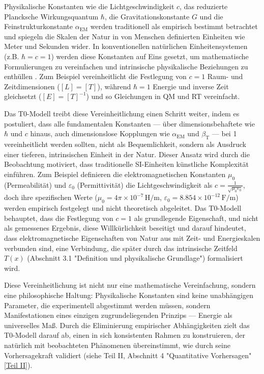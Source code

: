 \documentclass[12pt,a4paper]{article}
\newcommand{\Tfield}{T(x)}
\newcommand{\alphaEM}{\alpha_{\text{EM}}}
\newcommand{\betaT}{\beta_{\text{T}}}
\begin{document}
	Physikalische Konstanten wie die Lichtgeschwindigkeit \(c\), das reduzierte Plancksche Wirkungsquantum \(\hbar\), die Gravitationskonstante \(G\) und die Feinstrukturkonstante \(\alphaEM\) werden traditionell als empirisch bestimmt betrachtet und spiegeln die Skalen der Natur in von Menschen definierten Einheiten wie Meter und Sekunden wider. In konventionellen natürlichen Einheitensystemen (z.B. \(\hbar = c = 1\)) werden diese Konstanten auf Eins gesetzt, um mathematische Formulierungen zu vereinfachen und intrinsische physikalische Beziehungen zu enthüllen \cite{Planck1899,Duff2002}. Zum Beispiel vereinheitlicht die Festlegung von \(c = 1\) Raum- und Zeitdimensionen (\([L] = [T]\)), während \(\hbar = 1\) Energie und inverse Zeit gleichsetzt (\([E] = [T]^{-1}\)) und so Gleichungen in QM und RT vereinfacht.
	
	Das T0-Modell treibt diese Vereinheitlichung einen Schritt weiter, indem es postuliert, dass alle fundamentalen Konstanten — über dimensionsbehaftete wie \(\hbar\) und \(c\) hinaus, auch dimensionslose Kopplungen wie \(\alphaEM\) und \(\betaT\) — bei 1 vereinheitlicht werden sollten, nicht als Bequemlichkeit, sondern als Ausdruck einer tieferen, intrinsischen Einheit in der Natur. Dieser Ansatz wird durch die Beobachtung motiviert, dass traditionelle SI-Einheiten künstliche Komplexität einführen. Zum Beispiel definieren die elektromagnetischen Konstanten \(\mu_0\) (Permeabilität) und \(\varepsilon_0\) (Permittivität) die Lichtgeschwindigkeit als \(c = \frac{1}{\sqrt{\mu_0\varepsilon_0}}\), doch ihre spezifischen Werte (\(\mu_0 = 4\pi \times 10^{-7} \, \text{H/m}\), \(\varepsilon_0 = 8.854 \times 10^{-12} \, \text{F/m}\)) werden empirisch festgelegt und nicht theoretisch abgeleitet. Das T0-Modell behauptet, dass die Festlegung von \(c = 1\) als grundlegende Eigenschaft, und nicht als gemessenes Ergebnis, diese Willkürlichkeit beseitigt und darauf hindeutet, dass elektromagnetische Eigenschaften von Natur aus mit Zeit- und Energieskalen verbunden sind, eine Verbindung, die später durch das intrinsische Zeitfeld \(\Tfield\) (Abschnitt 3.1 "Definition und physikalische Grundlage") formalisiert wird.
	
	Diese Vereinheitlichung ist nicht nur eine mathematische Vereinfachung, sondern eine philosophische Haltung: Physikalische Konstanten sind keine unabhängigen Parameter, die experimentell abgestimmt werden müssen, sondern Manifestationen eines einzigen zugrundeliegenden Prinzips — Energie als universelles Maß. Durch die Eliminierung empirischer Abhängigkeiten zielt das T0-Modell darauf ab, einen in sich konsistenten Rahmen zu konstruieren, der natürlich mit beobachteten Phänomenen übereinstimmt, wie durch seine Vorhersagekraft validiert (siehe Teil II, Abschnitt 4 "Quantitative Vorhersagen" \href{https://github.com/jpascher/T0-Time-Mass-Duality/tree/main/2/pdf/Deutsch/QMRelTimeMassPart2.pdf}{[Teil II]}).
	
\end{document}
